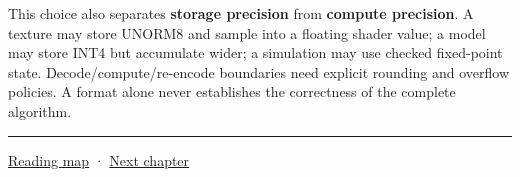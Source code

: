 This choice also separates \textbf{storage precision} from \textbf{compute precision}. A texture may store UNORM8 and sample into a floating shader value; a model may store INT4 but accumulate wider; a simulation may use checked fixed-point state. Decode/compute/re-encode boundaries need explicit rounding and overflow policies. A format alone never establishes the correctness of the complete algorithm.

\begin{center}\rule{0.5\linewidth}{0.5pt}\end{center}

\hyperref[volume-reading-map]{Reading map} · \hyperref[01-foundations-i-ch002-values-at-addresses-layout-lifetimes-and-representation]{Next chapter}
